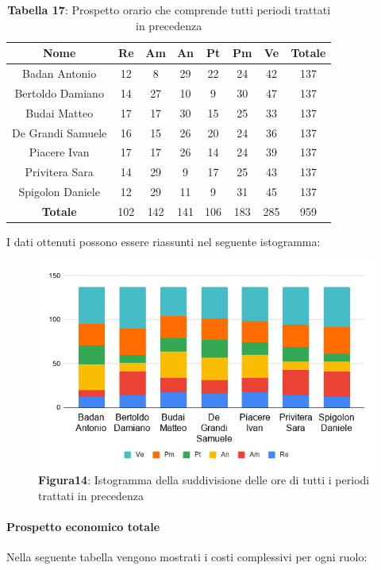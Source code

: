 \begin{table}[H]
	\centering
	\renewcommand{\arraystretch}{1.5}
	\begin{tabular}{|c|c|c|c|c|c|c|c|}
		\hline
		\rowcolor{lighter-grayer}
Nome & Re & Am & An & Pt & Pm & Ve & Totale \\ \hline
Badan Antonio & 12 & 8 & 29 & 22 & 24 & 42 & 137 \\ \hline
Bertoldo Damiano & 14 & 27 & 10 & 9 & 30 & 47 & 137 \\ \hline
Budai Matteo & 17 & 17 & 30 & 15 & 25 & 33 & 137 \\ \hline
De Grandi Samuele & 16 & 15 & 26 & 20 & 24 & 36 & 137 \\ \hline
Piacere Ivan & 17 & 17 & 26 & 14 & 24 & 39 & 137 \\ \hline
Privitera Sara & 14 & 29 & 9 & 17 & 25 & 43 & 137 \\ \hline
Spigolon Daniele & 12 & 29 & 11 & 9 & 31 & 45 & 137 \\ \hline
\textbf{Totale} & 102 & 142 & 141 & 106 & 183 & 285 & 959 \\ \hline
	\end{tabular}
	\caption*{\textbf{Tabella 17}: Prospetto orario che comprende tutti periodi trattati in precedenza\\}
\end{table}	
I dati ottenuti possono essere riassunti nel seguente istogramma:

\begin{figure}[H]
	\centering
	\includegraphics[width=0.7\linewidth]{res/images/IstogrammaTotale.png}
	\caption*{\textbf{Figura14}: Istogramma della suddivisione delle ore di tutti i periodi trattati in precedenza}
	\label{fig:Figura10}
\end{figure}

\paragraph{Prospetto economico totale}
Nella seguente tabella vengono mostrati i costi complessivi per ogni ruolo:


